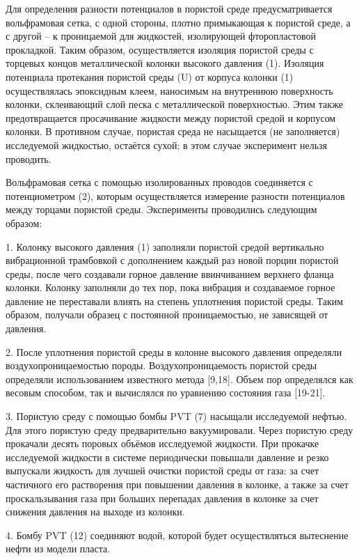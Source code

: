 Для определения разности потенциалов в пористой среде предусматривается
вольфрамовая сетка, с одной стороны, плотно примыкающая к пористой
среде, а с другой -- к проницаемой для жидкостей, изолирующей
фторопластовой прокладкой. Таким образом, осуществляется изоляция
пористой среды с торцевых концов металлической колонки высокого давления
(1). Изоляция потенциала протекания пористой среды (U) от корпуса
колонки (1) осуществлялась эпоксидным клеем, наносимым на внутреннюю
поверхность колонки, склеивающий слой песка с металлической
поверхностью. Этим также предотвращается просачивание жидкости между
пористой средой и корпусом колонки. В противном случае, пористая среда
не насыщается (не заполняется) исследуемой жидкостью, остаётся сухой; в
этом случае эксперимент нельзя проводить.

Вольфрамовая сетка с помощью изолированных проводов соединяется с
потенциометром (2), которым осуществляется измерение разности
потенциалов между торцами пористой среды. Эксперименты проводились
следующим образом:

1. Колонку высокого давления (1) заполняли пористой средой вертикально
вибрационной трамбовкой с дополнением каждый раз новой порции пористой
среды, после чего создавали горное давление ввинчиванием верхнего фланца
колонки. Колонку заполняли до тех пор, пока вибрация и создаваемое
горное давление не переставали влиять на степень уплотнения пористой
среды. Таким образом, получали образец с постоянной проницаемостью, не
зависящей от давления.

2. После уплотнения пористой среды в колонне высокого давления
определяли воздухопроницаемостью породы. Воздухопроницаемость пористой
среды определяли использованием известного метода {[}9,18{]}. Объем пор
определялся как весовым способом, так и вычислялся по уравнению
состояния газа {[}19-21{]}.

3. Пористую среду с помощью бомбы PVT (7) насыщали исследуемой нефтью.
Для этого пористую среду предварительно вакуумировали. Через пористую
среду прокачали десять поровых объёмов исследуемой жидкости. При
прокачке исследуемой жидкости в системе периодически повышали давление и
резко выпускали жидкость для лучшей очистки пористой среды от газа: за
счет частичного его растворения при повышении давления в колонке, а
также за счет проскальзывания газа при больших перепадах давления в
колонке за счет снижения давления на выходе из колонки.

4. Бомбу PVT (12) соединяют водой, которой будет осуществляться
вытеснение нефти из модели пласта.

